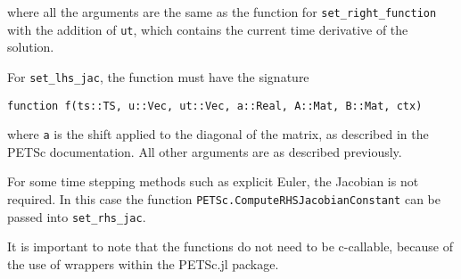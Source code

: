 \documentclass{article}
\begin{document}
\noindent where all the arguments are the same as the function for 
\texttt{set\_right\_function} with the addition of \texttt{ut}, which contains
the current time derivative of the solution.

For \texttt{set\_lhs\_jac}, the function must have the signature

\begin{verbatim}
function f(ts::TS, u::Vec, ut::Vec, a::Real, A::Mat, B::Mat, ctx)
\end{verbatim}
\noindent where \texttt{a} is the shift applied to the diagonal of the matrix, as 
described in the PETSc documentation.  All other arguments are as described
previously.

For some time stepping methods such as explicit Euler, the Jacobian is not 
required.  In this case the function \texttt{PETSc.ComputeRHSJacobianConstant}
can be passed into \texttt{set\_rhs\_jac}.

It is important to note that the functions do not need to be c-callable, 
because of the use of wrappers within the PETSc.jl package.
\end{document}
